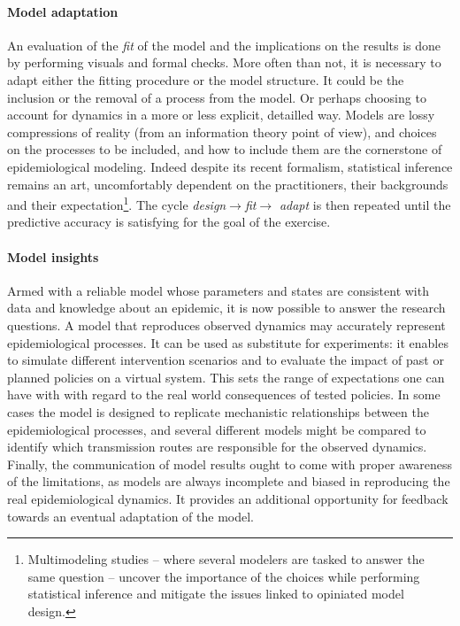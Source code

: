 \paragraph{Model adaptation} An evaluation of the \textit{fit} of the model and the implications on the results is done by performing visuals and formal checks. More often than not, it is necessary to adapt either the fitting procedure or the model structure. It could be the inclusion or the removal of a process from the model. Or perhaps choosing to account for dynamics in a more or less explicit, detailled way. Models are lossy compressions of reality (from an information theory point of view), and choices on the processes to be included, and how to include them are the cornerstone of epidemiological modeling. Indeed despite its recent formalism, statistical inference remains an art, uncomfortably dependent on the practitioners, their backgrounds and their expectation\footnote{Multimodeling studies -- where several modelers are tasked to answer the same question -- uncover the importance of the choices while performing statistical inference and mitigate the issues linked to opiniated model design.}. The cycle \textit{design}$\rightarrow$\textit{fit}$\rightarrow$ \textit{adapt} is then repeated until the predictive accuracy is satisfying for the goal of the exercise. 

\paragraph{Model insights}  Armed with a reliable model whose parameters and states are consistent with data and knowledge about an epidemic, it is now possible to answer the research questions. A model that reproduces observed dynamics may accurately represent epidemiological processes. It can be used as substitute for experiments: it enables to simulate different intervention scenarios and to evaluate the impact of past or planned policies on a virtual system. This sets the range of expectations one can have with with regard to the real world consequences of tested policies. In some cases the model is designed to replicate mechanistic relationships between the epidemiological processes, and several different models might be compared to identify which transmission routes are responsible for the observed dynamics.  Finally, the communication of model results ought to come with proper awareness of the limitations, as models are always incomplete and biased in reproducing the real epidemiological dynamics. It provides an additional opportunity for feedback towards an eventual adaptation of the model\cite{Heesterbeek:ModelingInfectiousDisease:2015}. 

